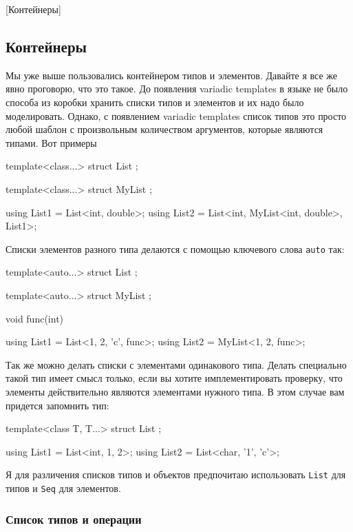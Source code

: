 [Контейнеры]


\subsection{Контейнеры}

Мы уже выше пользовались контейнером типов и элементов.
Давайте я все же явно проговорю, что это такое.
До появления variadic templates в языке не было способа из коробки хранить списки типов и элементов и их надо было моделировать.
Однако, с появлением variadic templates список типов это просто любой шаблон с произвольным количеством аргументов, которые являются типами.
Вот примеры
\begin{cppcode}
template<class...>
struct List {};

template<class...>
struct MyList {};

using List1 = List<int, double>;
using List2 = List<int, MyList<int, double>, List1>;
\end{cppcode}
Списки элементов разного типа делаются с помощью ключевого слова \verb"auto" так:
\begin{cppcode}
template<auto...>
struct List {};

template<auto...>
struct MyList {};

void func(int) {}

using List1 = List<1, 2, 'c', func>;
using List2 = MyList<1, 2, func>;
\end{cppcode}
Так же можно делать списки с элементами одинакового типа.
Делать специально такой тип имеет смысл только, если вы хотите имплементировать проверку, что элементы действительно являются элементами нужного типа.
В этом случае вам придется запомнить тип:
\begin{cppcode}
template<class T, T...>
struct List {};

using List1 = List<int, 1, 2>;
using List2 = List<char, '1', 'c'>;
\end{cppcode}
Я для различения списков типов и объектов предпочитаю использовать \verb"List" для типов и \verb"Seq" для элементов.

\subsubsection{Список типов и операции}
\label{section::TypeListOps}

